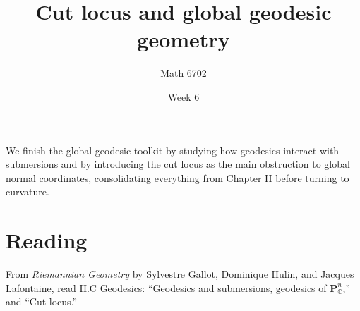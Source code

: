 \documentclass{article}
\title{Cut locus and global geodesic geometry}
\author{Math 6702}
\date{Week 6}
\begin{document}
\maketitle

We finish the global geodesic toolkit by studying how geodesics interact with submersions and by introducing the cut locus as the main obstruction to global normal coordinates, consolidating everything from Chapter II before turning to curvature.

\section*{Reading}
From \textit{Riemannian Geometry} by Sylvestre Gallot, Dominique Hulin, and Jacques Lafontaine, read \textsection II.C Geodesics: ``Geodesics and submersions, geodesics of $\mathbf{P}^n_{\mathbb{C}}$,'' and ``Cut locus.''
\end{document}
